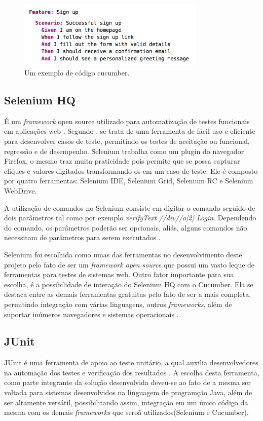 \documentclass[tg]{mdtufsm}
\begin{document}
\begin{figure}[!htb]
    \centering
    \includegraphics[width=0.8\textwidth]{codigo_cucumber}
    \caption{Um exemplo de código cucumber.}
    \label{fig:codigo_cucumber}
\end{figure}

\subsection{Selenium HQ}
É um \emph{framework} open source utilizado para automatização de testes funcionais em aplicações web \cite{chiavegatto1desenvolvimento}. Segundo \citeauthor{pereiraestudoselenium} \cite{pereiraestudoselenium}, se trata
de uma ferramenta de fácil uso e eficiente para desenvolver casos de teste, permitindo os testes de aceitação ou funcional, regressão e de desempenho.
Selenium trabalha como um plugin do navegador Firefox, o mesmo traz muita praticidade pois permite que se possa capturar cliques e valores digitados transformando-os em um caso de teste. Ele é composto por
quatro ferramentas: Selenium IDE, Selenium Grid, Selenium RC e Selenium WebDrive.

A  utilização  de  comandos  no  Selenium  consiste  em  digitar  o  comando  seguido  de  dois parâmetros  tal  como  por  exemplo \emph{verifyText //div//a[2] Login}. Dependendo  do  comando,  os parâmetros
poderão ser opcionais, aliás, alguns comandos não necessitam de parâmetros para serem executados \cite{sixpenceautomatizaccao}.

Selenium foi escolhida como umas das ferramentas no desenvolvimento deste projeto pelo fato de ser um \emph{framework open source} que possui um vasto leque de ferramentas para testes de sistemas web. Outro fator
importante para sua escolha, é a possibilidade de interação do Selenium HQ com o Cucumber. Ela  se  destaca  entre  as demais ferramentas  gratuitas pelo fato de ser a mais completa, permitindo integração com
várias linguagens,  outros \emph{frameworks}, além de suportar inúmeros navegadores e sistemas operacionais \cite{pereiraestudoselenium}.

\subsection{JUnit}
JUnit é uma ferramenta de apoio ao teste unitário, a qual auxilia desenvolvedores na automação dos testes e verificação dos resultados \cite{biasi2006geraccao}. A escolha desta ferramenta, como parte integrante da solução desenvolvida deveu-se ao fato
de a mesma ser voltada para sistemas desenvolvidos na linguagem de programção Java, além de ser altamente versátil, possibilitando assim, integração em um único código da mesma com os demais \emph{frameworks} que seroã utilizados(Selenium e Cucumber).
\end{document}
